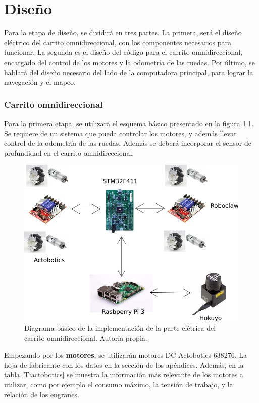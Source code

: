   \chapter{Diseño}
\label{C:diseño}

Para la etapa de diseño, se dividirá en tres partes. La primera, será el diseño eléctrico del carrito omnidireccional, con los componentes necesarios para funcionar. La segunda es el diseño del código para el carrito omnidireccional, encargado del control de los motores y la odometría de las ruedas. Por último, se hablará del diseño necesario del lado de la computadora principal, para lograr la navegación y el mapeo.

\newpage

\subsection{Carrito omnidireccional}
Para la primera etapa, se utilizará el esquema básico presentado en la figura \ref{F:diagrama}. Se requiere de un sistema que pueda controlar los motores, y además llevar control de la odometría de las ruedas. Además se deberá incorporar el sensor de profundidad en el carrito omnidireccional.

\begin{figure}[H]
\centering
\includegraphics[scale=0.6]{imagenes/diagrama_diseno.png}
\caption{Diagrama básico de la implementación de la parte elétrica del carrito omnidireccional. Autoría propia.}
\label{F:diagrama}
\end{figure}

Empezando por los \textbf{motores}, se utilizarán motores DC Actobotics 638276. La hoja de fabricante con los datos en la sección de los apéndices. Además, en la tabla \ref{T:actobotics} se muestra la información más relevante de los motores a utilizar, como por ejemplo el consumo máximo, la tensión de trabajo, y la relación de los engranes.

